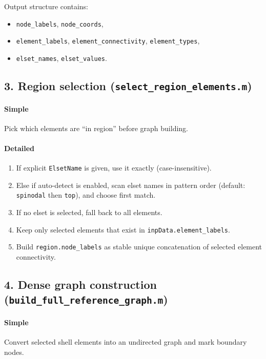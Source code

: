 \documentclass[11pt]{article}
\begin{document}
Output structure contains:
\begin{itemize}
  \item \texttt{node\_labels}, \texttt{node\_coords},
  \item \texttt{element\_labels}, \texttt{element\_connectivity}, \texttt{element\_types},
  \item \texttt{elset\_names}, \texttt{elset\_values}.
\end{itemize}

\subsection*{3. Region selection (\texttt{select\_region\_elements.m})}
\paragraph{Simple}
Pick which elements are ``in region'' before graph building.

\paragraph{Detailed}
\begin{enumerate}
  \item If explicit \texttt{ElsetName} is given, use it exactly (case-insensitive).
  \item Else if auto-detect is enabled, scan elset names in pattern order
  (default: \texttt{spinodal} then \texttt{top}), and choose first match.
  \item If no elset is selected, fall back to all elements.
  \item Keep only selected elements that exist in \texttt{inpData.element\_labels}.
  \item Build \texttt{region.node\_labels} as stable unique concatenation of selected element connectivity.
\end{enumerate}

\subsection*{4. Dense graph construction (\texttt{build\_full\_reference\_graph.m})}
\paragraph{Simple}
Convert selected shell elements into an undirected graph and mark boundary nodes.
\end{document}
